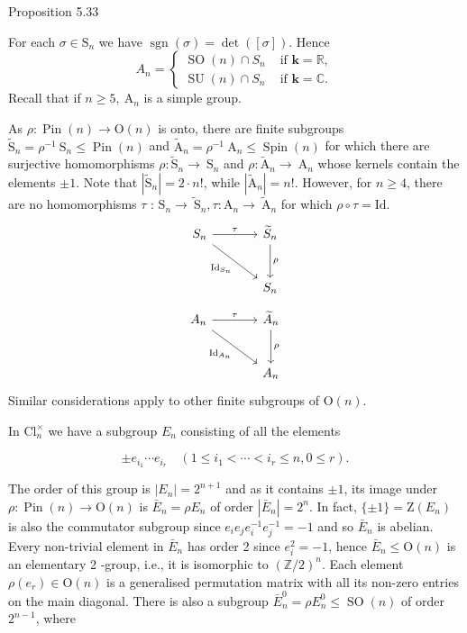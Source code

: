 \documentclass[10pt, letterpaper]{article}
\begin{document}
Proposition 5.33


For each $\sigma \in \mathrm{S}_{n}$ we have $\operatorname{sgn}(\sigma)=\operatorname{det}([\sigma])$. Hence
$$
A_{n}= \begin{cases}\operatorname{SO}(n) \cap S_{n} & \text { if } \mathbf{k}=\mathbb{R}, \\ \operatorname{SU}(n) \cap S_{n} & \text { if } \mathbf{k}=\mathbb{C} .\end{cases}
$$
Recall that if $n \geqslant 5, \mathrm{~A}_{n}$ is a simple group.


As $\rho: \operatorname{Pin}(n) \longrightarrow \mathrm{O}(n)$ is onto, there are finite subgroups $\widetilde{\mathrm{S}}_{n}=\rho^{-1} \mathrm{~S}_{n} \leqslant \operatorname{Pin}(n)$ and $\widetilde{\mathrm{A}}_{n}=\rho^{-1} \mathrm{~A}_{n} \leqslant \operatorname{Spin}(n)$ for which there are surjective homomorphisms $\rho: \widetilde{\mathrm{S}}_{n} \longrightarrow \mathrm{~S}_{n}$ and $\rho: \widetilde{\mathrm{A}}_{n} \longrightarrow \mathrm{~A}_{n}$ whose kernels contain the elements $\pm 1$. Note that $\left|\widetilde{\mathrm{S}}_{n}\right|=2 \cdot n!$, while $\left|\widetilde{\mathrm{A}}_{n}\right|=n!$. However, for $n \geqslant 4$, there are no homomorphisms $\tau$ : $\mathrm{S}_{n} \longrightarrow \widetilde{\mathrm{~S}}_{n}, \tau: \mathrm{A}_{n} \longrightarrow \widetilde{\mathrm{~A}}_{n}$ for which $\rho \circ \tau=\mathrm{Id}$.
\[
\begin{tikzcd}[row sep=large, column sep=large]
S_n \arrow[r, "\tau"] \arrow[dr, "\mathrm{Id}_{S_n}"'] 
& \widetilde{S}_n \arrow[d, "\rho"] \\
& S_n
\end{tikzcd}
\]
\[
\begin{tikzcd}[row sep=large, column sep=large]
A_n \arrow[r, "\tau"] \arrow[dr, "\mathrm{Id}_{A_n}"'] 
& \widetilde{A}_n \arrow[d, "\rho"] \\
& A_n
\end{tikzcd}
\]
Similar considerations apply to other finite subgroups of $\mathrm{O}(n)$.

In $\mathrm{Cl}_{n}^{\times}$ we have a subgroup $E_{n}$ consisting of all the elements

$$
\pm e_{i_{1}} \cdots e_{i_{r}} \quad\left(1 \leqslant i_{1}<\cdots<i_{r} \leqslant n, 0 \leqslant r\right) .
$$

The order of this group is $\left|E_{n}\right|=2^{n+1}$ and as it contains $\pm 1$, its image under $\rho: \operatorname{Pin}(n) \longrightarrow \mathrm{O}(n)$ is $\bar{E}_{n}=\rho E_{n}$ of order $\left|\bar{E}_{n}\right|=2^{n}$. In fact, $\{ \pm 1\}=\mathrm{Z}\left(E_{n}\right)$ is also the commutator subgroup since $e_{i} e_{j} e_{i}^{-1} e_{j}^{-1}=-1$ and so $\bar{E}_{n}$ is abelian. Every non-trivial element in $\bar{E}_{n}$ has order 2 since $e_{i}^{2}=-1$, hence $\bar{E}_{n} \leqslant \mathrm{O}(n)$ is an elementary 2 -group, i.e., it is isomorphic to $(\mathbb{Z} / 2)^{n}$. Each element $\rho\left(e_{r}\right) \in \mathrm{O}(n)$ is a generalised permutation matrix with all its non-zero entries on the main diagonal. There is also a subgroup $\bar{E}_{n}^{0}=\rho E_{n}^{0} \leqslant \operatorname{SO}(n)$ of order $2^{n-1}$, where
\end{document}
